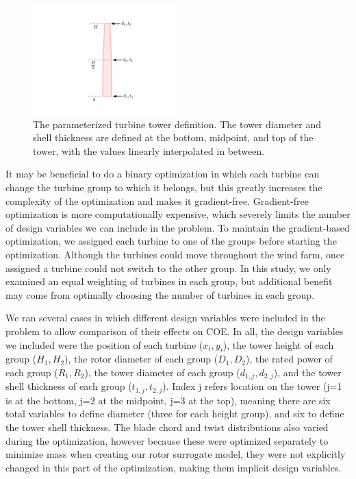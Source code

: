 \documentclass[WESD, manuscript]{copernicus}
\begin{document}
\begin{figure}[htbp]
  \centering
  \includegraphics[trim={0 1.5cm 0 2cm},clip,width=0.5\textwidth]{Figures/tower_param.pdf}
  \caption{\label{tower_def} The parameterized turbine tower definition. The tower diameter and shell thickness are defined at the bottom, midpoint, and top of the tower, with the values linearly interpolated in between.}
\end{figure}
        
        It may be beneficial to do a binary optimization in which each turbine can change the turbine group to which it belongs, but this greatly increases the complexity of the optimization and makes it gradient-free. Gradient-free optimization is more computationally expensive, which severely limits the number of design variables we can include in the problem. To maintain the gradient-based optimization, we assigned each turbine to one of the groups before starting the optimization. Although the turbines could move throughout the wind farm, once assigned a turbine could not switch to the other group. In this study, we only examined an equal weighting of turbines in each group, but additional benefit may come from optimally choosing the number of turbines in each group.
        
        We ran several cases in which different design variables were included in the problem to allow comparison of their effects on COE. In all, the design variables we included were the position of each turbine ($x_i,y_i$), the tower height of each group ($H_1, H_2$), the rotor diameter of each group ($D_1, D_2$), the rated power of each group ($R_1, R_2$), the tower diameter of each group ($d_{1,j}, d_{2,j}$), and the tower shell thickness of each group ($t_{1,j}, t_{2,j}$). Index j refers location on the tower (j=1 is at the bottom, j=2 at the midpoint, j=3 at the top), meaning there are six total variables to define diameter (three for each height group), and six to define the tower shell thickness. The blade chord and twist distributions also varied during the optimization, however because these were optimized separately to minimize mass when creating our rotor surrogate model, they were not explicitly changed in this part of the optimization, making them implicit design variables.
                
\end{document}
